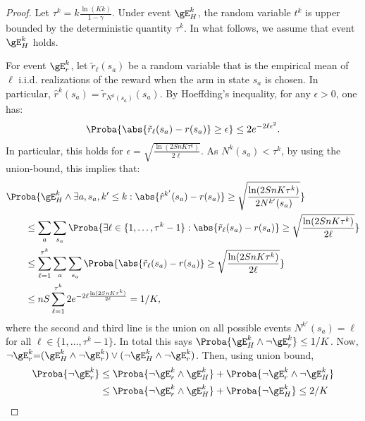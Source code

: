 \begin{subappendices}
\begin{proof}
    Let $\tau^k = k\frac{\ln(Kk)}{1-\gamma}$. Under event $\gE^{k}_H$, the random variable $t^k$ is upper bounded by the deterministic quantity $\tau^k$. In what follows, we assume that event $\gE^{k}_H$ holds.

    For event $\gE^{k}_r$, let $\tilde{r}_\ell(s_a)$ be a random variable that is the empirical mean of $\ell$ i.i.d. realizations of the reward when the arm in state $s_a$ is chosen. In particular, ${\hat{r}^{k}(s_a) = \tilde{r}_{N^{k}(s_a)}(s_a)}$. By Hoeffding's inequality, for any $\epsilon>0$, one has:
    \begin{align*}
        \Proba{\abs{\tilde{r}_\ell(s_a) - r(s_a)} \ge \epsilon  } \le 2 e^{-2 \ell\epsilon^2}.
    \end{align*}
    In particular, this holds for $\epsilon=\sqrt{\frac{\ln (2SnK\tau^k)}{2\ell}}$. As $N^{k}(s_a)< \tau^k$, by using the union-bound, this implies that: 
    \begin{align}
        &\Proba{\gE^{k}_H \land \exists a, s_a, k'\le k: \abs{\hat{r}^{k'}(s_a) - r(s_a)} \ge \sqrt{\frac{\ln (2SnK\tau^k)}{2N^{k'}(s_a)}}}\label{eq:estR_k}\\
        &\qquad\le \sum_{a}\sum_{s_a}\Proba{\exists \ell\in\{1,\dots,\tau^k-1\}: \abs{\tilde{r}_{\ell}(s_a) - r(s_a)} \ge \sqrt{\frac{\ln (2SnK\tau^k)}{2\ell}}}\nonumber\\
        &\qquad\le \sum_{\ell=1}^{\tau^k}\sum_a\sum_{s_a}\Proba{\abs{\tilde{r}_{\ell}(s_a) - r(s_a)} \ge \sqrt{\frac{\ln (2SnK\tau^k)}{2\ell}}}\nonumber\\
        &\qquad\le  n S \sum_{\ell=1}^{\tau^k} 2e^{-2 \ell \frac{\ln (2SnK\tau^k)}{2\ell}} =1/K,\nonumber
    \end{align}
    where the second and third  line is the union on all possible events $N^{k'}(s_a){=}\ell$ for all ${\ell{\in}\{1,\dots, \tau^k-1\}}$.
    In total this says $\Proba{\gE^{k}_H\land \lnot \gE^{k}_r}\le 1/K$.
    Now, $\lnot \gE^{k}_r {=}(\gE^{k}_H \land \lnot \gE^{k}_r) \lor (\lnot \gE^{k}_H \land \lnot \gE^{k}_r)$.
    Then, using union bound,
    \begin{align*}
        \Proba{\lnot \gE^{k}_r}
        &\le \Proba{\lnot \gE^{k}_r \land \gE^{k}_H} + \Proba{\lnot \gE^{k}_r \land \lnot \gE^{k}_H} \\
        &\le \Proba{\lnot \gE^{k}_r \land \gE^{k}_H} + \Proba{\lnot \gE^{k}_H} \le 2/K
    \end{align*}


\end{proof}
\end{subappendices}
